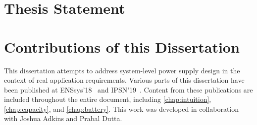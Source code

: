 %
%


\section{Thesis Statement}

\section{Contributions of this Dissertation}
This dissertation attempts to address system-level power supply design in the context of real application requirements.
Various parts of this dissertation have been published at ENSsys'18~\cite{jackson2018reconsidering} and IPSN'19~\cite{jackson2019capacity}. Content from these publications are included throughout the entire document, including \cref{chap:intuition}, \cref{chap:capacity}, and \cref{chap:battery}. This work was developed in collaboration with Joshua Adkins and Prabal Dutta.

